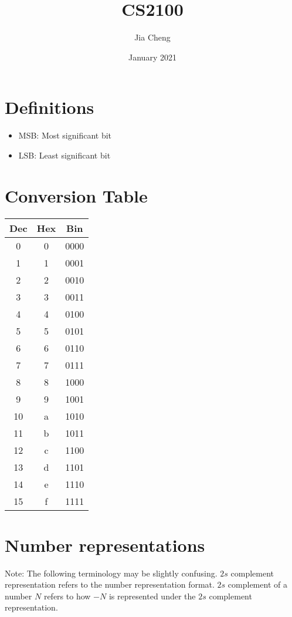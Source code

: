 \documentclass{article}
\title{CS2100}
\author{Jia Cheng}
\date{January 2021}
\begin{document}
\maketitle

\section{Definitions}
\begin{itemize}
	\item MSB: Most significant bit
	\item LSB: Least significant bit
\end{itemize}

\section{Conversion Table}
\begin{center}
\begin{tabular}{ c|c|c } 
 	Dec & Hex & Bin\\
	\hline
	0&	0&	0000\\	 	
	1&	1&	0001\\	 	
	2&	2&	0010\\	 	
	3&	3&	0011\\	 	
	4&	4&	0100\\	 	
	5&	5&	0101\\	 	
	6&	6&	0110\\	 	
	7&	7&	0111\\	 	
	8&	8&	1000\\	 	
	9&	9&	1001\\	 	
	10&	a&	1010\\	 	
	11&	b&	1011\\	 	
	12&	c&	1100\\	 	
	13&	d&	1101\\	 	
	14&	e&	1110\\	 	
	15&	f&	1111\\
	\hline
\end{tabular}
\end{center}


\section{Number representations}

Note: The following terminology may be slightly confusing. 
$2s$ complement representation refers to the number representation format.
$2s$ complement of a number $N$ refers to how $-N$ is represented under the $2s$ complement representation.
\end{document}
